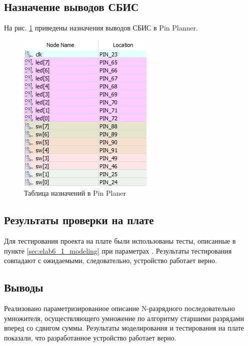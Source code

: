 \newpage

\subsection{Назначение выводов СБИС}

На рис. \ref{fig:elab6_1_pins} приведены назначения выводов СБИС в Pin Planner.

\begin{figure}[H]
\begin{center}
	\includegraphics{elab6_1_pins}
	\caption{Таблица назначений в Pin Planer}
	\label{fig:elab6_1_pins}
\end{center}
\end{figure}

\subsection{Результаты проверки на плате}

Для тестирования проекта на плате были использованы тесты, описанные в пункте \ref{sec:elab6_1_modeling} при параметрах . Результаты тестирования совпадают с ожидаемыми, следовательно, устройство работает верно.

\subsection{Выводы}

Реализовано параметризированное описание N-разрядного последовательно умножителя, осуществляющего умножение по алгоритму старшими разрядами вперед со сдвигом суммы. Результаты моделирования и тестирования на плате показали, что разработанное устройство работает верно.

\newpage

